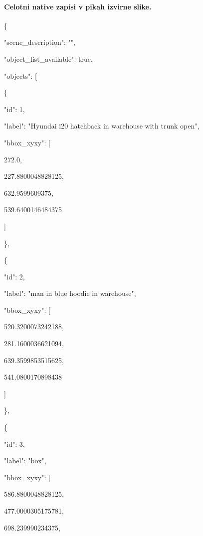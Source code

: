 \documentclass[10pt,a4paper]{article}
\begin{document}
\paragraph{Celotni native zapisi v pikah izvirne slike.}
\{\par
  "scene\_description":\allowbreak{} "",\allowbreak{}\par
  "object\_list\_available":\allowbreak{} true,\allowbreak{}\par
  "objects":\allowbreak{} [\par
    \{\par
      "id":\allowbreak{} 1,\allowbreak{}\par
      "label":\allowbreak{} "Hyundai i20 hatchback in warehouse with trunk open",\allowbreak{}\par
      "bbox\_xyxy":\allowbreak{} [\par
        272.0,\allowbreak{}\par
        227.8800048828125,\allowbreak{}\par
        632.9599609375,\allowbreak{}\par
        539.6400146484375\par
      ]\par
    \},\allowbreak{}\par
    \{\par
      "id":\allowbreak{} 2,\allowbreak{}\par
      "label":\allowbreak{} "man in blue hoodie in warehouse",\allowbreak{}\par
      "bbox\_xyxy":\allowbreak{} [\par
        520.3200073242188,\allowbreak{}\par
        281.1600036621094,\allowbreak{}\par
        639.3599853515625,\allowbreak{}\par
        541.0800170898438\par
      ]\par
    \},\allowbreak{}\par
    \{\par
      "id":\allowbreak{} 3,\allowbreak{}\par
      "label":\allowbreak{} "box",\allowbreak{}\par
      "bbox\_xyxy":\allowbreak{} [\par
        586.8800048828125,\allowbreak{}\par
        477.0000305175781,\allowbreak{}\par
        698.239990234375,\allowbreak{}\par
\end{document}
